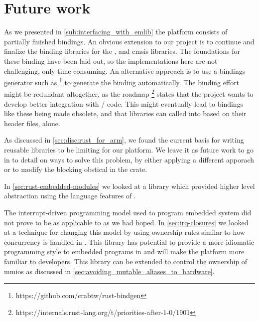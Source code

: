 \section{Future work}
\label{chap:future}

As we presented in \autoref{sub:interfacing_with_emlib} the platform consists of partially finished bindings.
An obvious extension to our project is to continue and finalize the binding libraries for the {\emlib}, {\emdrv} and \gls{cmsis} libraries.
The foundations for these binding have been laid out, so the implementations here are not challenging, only time-consuming.
An alternative approach is to use a bindings generator such as  \footnote{https://github.com/crabtw/rust-bindgen} to generate the binding automatically.
The binding effort might be redundant altogether, as the {\rust} roadmap \footnote{https://internals.rust-lang.org/t/priorities-after-1-0/1901} states that the project wants to develop better integration with {\C}/{\Cpp} code.
This might eventually lead to bindings like these being made obsolete, and that {\C} libraries can called into based on their header files, alone.

As discussed in \autoref{sec:disc:rust_for_arm}, we found the current basis for writing reusable libraries to be limiting for our platform.
We leave it as future work to go in to detail on ways to solve this problem, by either applying a different apporach or to modify the blocking obstical in the  crate.

In \autoref{sec:rust-embedded-modules} we looked at a library which provided higher level abstraction using the language features of {\rust}.

The interrupt-driven programming model used to program embedded system did not prove to be as applicable to {\rust} as we had hoped.
In \autoref{sec:irq-closures} we looked at a technique for changing this model by using ownership rules similar to how concurrency is handled in {\rust}.
This library has potential to provide a more idiomatic programming style to embedded programs in {\rust} and will make the platform more familiar to {\rust} developers.
This library can be extended to control the ownership of \glspl{mmio} as discussed in \autoref{sec:avoiding_mutable_aliases_to_hardware}.

